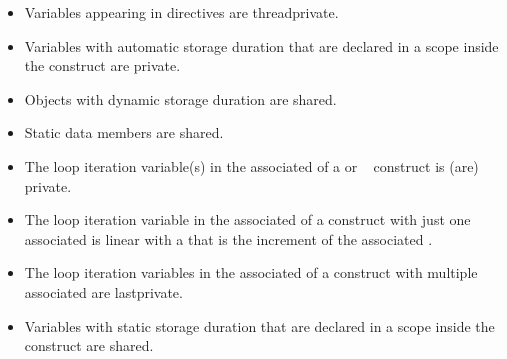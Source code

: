 \ccppspecificstart
\begin{itemize}
\item Variables appearing in  directives are threadprivate.

\item Variables with automatic storage duration that are declared in a scope inside the 
construct are private. 

\item Objects with dynamic storage duration are shared.

\item Static data members are shared.

\item The loop iteration variable(s) in the associated  of a  or 
~ construct is (are) private. 

\item The loop iteration variable in the associated  of a  construct with just 
one associated  is linear with a  that is the increment of 
the associated .

\item The loop iteration variables in the associated  of a  construct with 
multiple associated  are lastprivate. 

\item Variables with static storage duration that are declared in a scope inside the construct 
are shared.
\end{itemize}
\ccppspecificend

